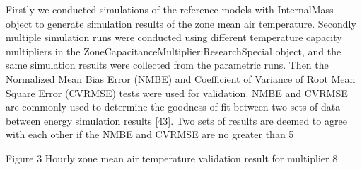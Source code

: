  Firstly we conducted simulations of the reference models with InternalMass object to generate simulation results of the zone mean air temperature. Secondly multiple simulation runs were conducted using different temperature capacity multipliers in the ZoneCapacitanceMultiplier:ResearchSpecial object, and the same simulation results were collected from the parametric runs. Then the Normalized Mean Bias Error (NMBE) and Coefficient of Variance of Root Mean Square Error (CVRMSE) tests were used for validation. NMBE and CVRMSE are commonly used to determine the goodness of fit between two sets of data between energy simulation results [43].  Two sets of results are deemed to agree with each other if the NMBE and CVRMSE are no greater than 5%

  

Figure 3 Hourly zone mean air temperature validation result for multiplier 8

